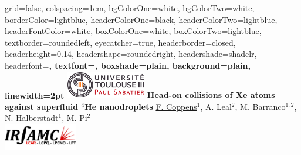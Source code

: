 \documentclass[portrait,a0paper,fontscale=0.277]{baposter}
\begin{document}
\begin{poster}%
  {
  grid=false,
  colspacing=1em,
  bgColorOne=white,
  bgColorTwo=white,
  borderColor=lightblue,
  headerColorOne=black,
  headerColorTwo=lightblue,
  headerFontColor=white,
  boxColorOne=white,
  boxColorTwo=lightblue,
  textborder=roundedleft,
  eyecatcher=true,
  headerborder=closed,
  headerheight=0.14\textheight,
  headershape=roundedright,
  headershade=shadelr,
  headerfont=\normalsize\bf\textsc, %
  textfont={\setlength{\parindent}{1.5em}},
  boxshade=plain,
  background=plain,
  linewidth=2pt
  }
  {\includegraphics[height=3.25em]{images/logo1-2.jpeg}} 
  {\bf\Large{Head-on collisions of Xe atoms against superfluid $^4$He nanodroplets}\vspace{0.5em}}
  {\normalsize{ \underline{F. Coppens}$^1$, A. Leal$^2$, M. Barranco$^{1,2}$, N. Halberstadt$^1$, M. Pi$^2$\vspace{0.5em}} \\
}
  {%
   \includegraphics[height=3.25em]{images/logo_irsamc}
  }


\end{poster}
\end{document}
